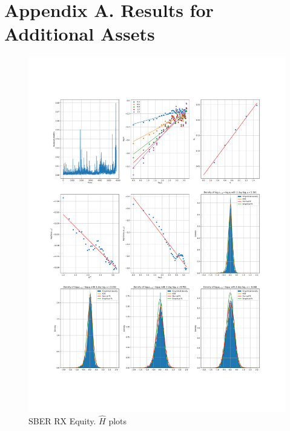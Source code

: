 \section{Appendix A. Results for Additional Assets}
    \noindent
    \begin{figure}[h]
        \centering
        \includegraphics[width=\textwidth]{fig/SBER RX Equity.pdf}
        \caption{SBER RX Equity. $\hat{H}$ plots}
    \end{figure}

